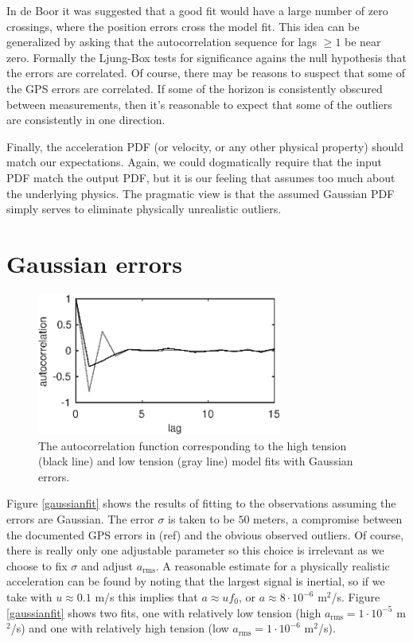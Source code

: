 \documentclass[twocol]{ametsoc}
\begin{document}
In de Boor it was suggested that a good fit would have a large number of zero crossings, where the position errors cross the model fit. This idea can be generalized by asking that the autocorrelation sequence for lags $\geq 1$ be near zero. Formally the Ljung-Box tests for significance agains the null hypothesis that the errors are correlated. Of course, there may be reasons to suspect that some of the GPS errors are correlated. If some of the horizon is consistently obscured between measurements, then it's reasonable to expect that some of the outliers are consistently in one direction.

Finally, the acceleration PDF (or velocity, or any other physical property) should match our expectations. Again, we could dogmatically require that the input PDF match the output PDF, but it is our feeling that assumes too much about the underlying physics. The pragmatic view is that the assumed Gaussian PDF simply serves to eliminate physically unrealistic outliers.

\section{Gaussian errors}

\begin{figure}
  \centerline{\includegraphics[width=19pc,angle=0]{gaussianacf}}
  \caption{The autocorrelation function corresponding to the high tension (black line) and low tension (gray line) model fits with Gaussian errors.}
  \label{gaussianacf}
\end{figure}

Figure \ref{gaussianfit} shows the results of fitting to the observations assuming the errors are Gaussian. The error $\sigma$ is taken to be $50$ meters, a compromise between the documented GPS errors in (ref) and the obvious observed outliers. Of course, there is really only one adjustable parameter so this choice is  irrelevant as we choose to fix $\sigma$ and adjust $a_{\textrm{rms}}$.  A reasonable estimate for a physically realistic acceleration can be found by noting that the largest signal is inertial, so if we take with $u \approx 0.1$ m/s this implies  that $a \approx u f_0$, or $a \approx 8 \cdot 10^{-6}$ m$^2$/s. Figure \ref{gaussianfit} shows two fits, one with relatively low tension (high $a_{\textrm{rms}}=1 \cdot 10^{-5}$ m$^2$/s) and one with relatively high tension (low $a_{\textrm{rms}}=1 \cdot 10^{-6}$ m$^2$/s).
\end{document}
